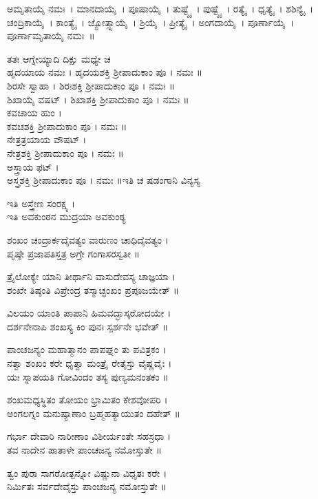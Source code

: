  ಅಮೃತಾಯೈ ನಮಃ~।  ಮಾನದಾಯೈ~।  ಪೂಷಾಯೈ~।  ತುಷ್ಟ್ಯೈ~।  ಪುಷ್ಟ್ಯೈ~।  ರತ್ಯೈ~।  ಧೃತ್ಯೈ~।  ಶಶಿನ್ಯೈ~।  ಚಂದ್ರಿಕಾಯೈ~।  ಕಾಂತ್ಯೈ~।  ಜ್ಯೋತ್ಸ್ನಾಯೈ~।  ಶ್ರಿಯೈ~।  ಪ್ರೀತ್ಯೈ~।  ಅಂಗದಾಯೈ~।  ಪೂರ್ಣಾಯೈ~।  ಪೂರ್ಣಾಮೃತಾಯೈ ನಮಃ~॥

ತತಃ ಆಗ್ನೇಯ್ಯಾದಿ ದಿಕ್ಷು ಮಧ್ಯೇ ಚ \\
 ಹೃದಯಾಯ ನಮಃ । ಹೃದಯಶಕ್ತಿ ಶ್ರೀಪಾದುಕಾಂ ಪೂ । ನಮಃ ॥\\
 ಶಿರಸೇ ಸ್ವಾಹಾ । ಶಿರಃಶಕ್ತಿ ಶ್ರೀಪಾದುಕಾಂ ಪೂ । ನಮಃ ॥\\
 ಶಿಖಾಯೈ ವಷಟ್ । ಶಿಖಾಶಕ್ತಿ ಶ್ರೀಪಾದುಕಾಂ ಪೂ । ನಮಃ ॥\\
 ಕವಚಾಯ ಹುಂ ।\\ ಕವಚಶಕ್ತಿ ಶ್ರೀಪಾದುಕಾಂ ಪೂ । ನಮಃ ॥\\
 ನೇತ್ರತ್ರಯಾಯ ವೌಷಟ್ । \\ನೇತ್ರಶಕ್ತಿ ಶ್ರೀಪಾದುಕಾಂ ಪೂ । ನಮಃ ॥\\
 ಅಸ್ತ್ರಾಯ ಫಟ್ ।\\ ಅಸ್ತ್ರಶಕ್ತಿ ಶ್ರೀಪಾದುಕಾಂ ಪೂ । ನಮಃ ॥ಇತಿ ಚ ಷಡಂಗಾನಿ ವಿನ್ಯಸ್ಯ

 ಇತಿ ಅಸ್ತ್ರೇಣ ಸಂರಕ್ಷ್ಯ ।\\  ಇತಿ ಅವಕುಂಠನ ಮುದ್ರಯಾ ಅವಕುಂಠ್ಯ

ಶಂಖಂ ಚಂದ್ರಾರ್ಕದೈವತ್ಯಂ ವಾರುಣಂ ಚಾಧಿದೈವತ್ಯಂ ।\\
ಪೃಷ್ಠೇ ಪ್ರಜಾಪತಿಸ್ತತ್ರ ಅಗ್ರೇ ಗಂಗಾಸರಸ್ವತೀ ॥

ತ್ರೈಲೋಕ್ಯೇ ಯಾನಿ ತೀರ್ಥಾನಿ ವಾಸುದೇವಸ್ಯ ಚಾಜ್ಞಯಾ ।\\
ಶಂಖೇ ತಿಷ್ಠಂತಿ ವಿಪ್ರೇಂದ್ರ ತಸ್ಮಾಚ್ಛಂಖಂ ಪ್ರಪೂಜಯೇತ್ ॥

ವಿಲಯಂ ಯಾಂತಿ ಪಾಪಾನಿ ಹಿಮವದ್ಭಾಸ್ಕರೋದಯೇ ।\\
ದರ್ಶನೇನಾಪಿ ಶಂಖಸ್ಯ ಕಿಂ ಪುನಃ ಸ್ಪರ್ಶನೇ ಭವೇತ್ ॥

ಪಾಂಚಜನ್ಯಂ ಮಹಾತ್ಮಾನಂ ಪಾಪಘ್ನಂ ತು ಪವಿತ್ರಕಂ ।\\
ನತ್ವಾ ಶಂಖಂ ಕರೇ ಧೃತ್ವಾ ಮಂತ್ರೈ ರೇತೈಸ್ತು ವೈಷ್ಣವೈಃ ।\\
ಯಃ ಸ್ನಾಪಯತಿ ಗೋವಿಂದಂ ತಸ್ಯ ಪುಣ್ಯಮನಂತಕಂ ॥

ಶಂಖಮಧ್ಯಸ್ಥಿತಂ ತೋಯಂ ಭ್ರಾಮಿತಂ ಕೇಶವೋಪರಿ ।\\
ಅಂಗಲಗ್ನಂ ಮನುಷ್ಯಾಣಾಂ ಬ್ರಹ್ಮಹತ್ಯಾಯುತಂ ದಹೇತ್ ॥

ಗರ್ಭಾ ದೇವಾರಿ ನಾರೀಣಾಂ ವಿಶೀರ್ಯಂತೇ ಸಹಸ್ರಧಾ ।\\
ತವ ನಾದೇನ ಪಾತಾಳೇ ಪಾಂಚಜನ್ಯ ನಮೋಸ್ತುತೇ ॥

ತ್ವಂ ಪುರಾ ಸಾಗರೋತ್ಪನ್ನೋ ವಿಷ್ಣುನಾ ವಿಧೃತಃ ಕರೇ ।\\
ನಿರ್ಮಿತಃ ಸರ್ವದೇವೈಸ್ತು ಪಾಂಚಜನ್ಯ ನಮೋಸ್ತುತೇ ॥

